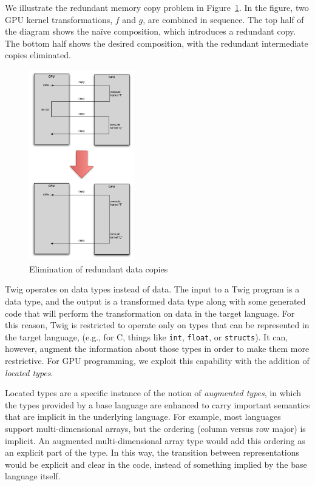We illustrate the redundant memory copy problem in Figure~\ref{basic-idea}. In the figure, two GPU kernel transformations, $f$ and $g$, are combined in sequence. The top half of the diagram shows the na\"ive composition, which introduces a redundant copy. The bottom half shows the desired composition, with the redundant intermediate copies eliminated.

\begin{figure}[ht]
\begin{center}
\includegraphics[width=1.8in]{images/basic-idea}
\end{center}
\caption{Elimination of redundant data copies}
\label{basic-idea}
\end{figure}

Twig operates on data types instead of data. The input to a Twig program is a data type, and the output is a transformed data type along with some generated code that will perform the transformation on data in the target language. For this reason, Twig is restricted to operate only on types that can be represented in the target language, (e.g., for C, things like \texttt{int}, \texttt{float}, or \texttt{structs}). It can, however, augment the information about those types in order to make them more restrictive. For GPU programming, we exploit this capability with the addition of \emph{located types}.

Located types are a specific instance of the notion of \emph{augmented types}, in which the types provided by a base language are enhanced to carry important semantics that are implicit in the underlying language. For example, most languages support multi-dimensional arrays, but the ordering (column versus row major) is implicit. An augmented multi-dimensional array type would add this ordering as an explicit part of the type. In this way, the transition between representations would be explicit and clear in the code, instead of something implied by the base language itself.

